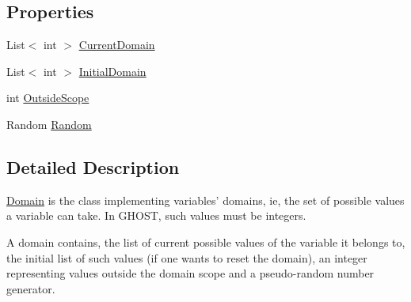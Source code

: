 \subsection*{Properties}
\begin{DoxyCompactItemize}
\item 
List$<$ int $>$ \hyperlink{classghost_1_1Domain_abd984b917c72272a80473d5428157671}{Current\-Domain}
\item 
List$<$ int $>$ \hyperlink{classghost_1_1Domain_a810463ee3ee80c8095bbdac1b30edb86}{Initial\-Domain}
\item 
int \hyperlink{classghost_1_1Domain_ac1ede7f9b03b36ff82f73039b9ba1a56}{Outside\-Scope}
\item 
Random \hyperlink{classghost_1_1Domain_aba5a8cf2502ff919644448730e309c85}{Random}
\end{DoxyCompactItemize}


\subsection{Detailed Description}
\hyperlink{classghost_1_1Domain}{Domain} is the class implementing variables' domains, ie, the set of possible values a variable can take. In G\-H\-O\-S\-T, such values must be integers.

A domain contains, the list of current possible values of the variable it belongs to, the initial list of such values (if one wants to reset the domain), an integer representing values outside the domain scope and a pseudo-\/random number generator. 

